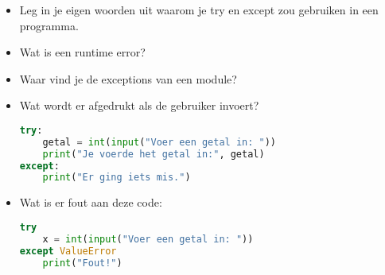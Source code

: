 \begin{itemize}
\item Leg in je eigen woorden uit waarom je try en except zou gebruiken in een programma.

\item Wat is een runtime error?

\item Waar vind je de exceptions van een module?

\item Wat wordt er afgedrukt als de gebruiker  invoert?
\begin{lstlisting}[language=python]
try:
    getal = int(input("Voer een getal in: "))
    print("Je voerde het getal in:", getal)
except:
    print("Er ging iets mis.")
\end{lstlisting}

\item Wat is er fout aan deze code:
\begin{lstlisting}[language=python]
try
    x = int(input("Voer een getal in: "))
except ValueError
    print("Fout!")
\end{lstlisting}

\end{itemize}
